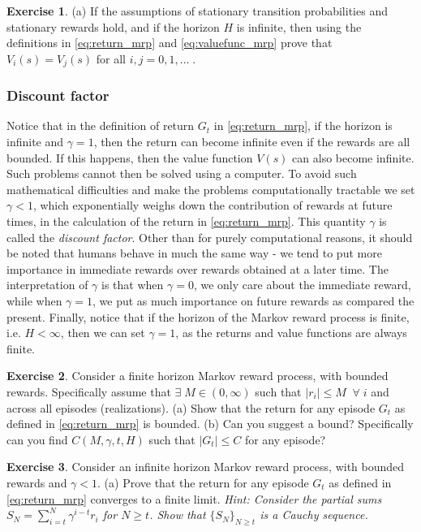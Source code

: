 \documentclass{article}
\theoremstyle{definition}
\newtheorem{exercise}{Exercise}[section]
\theoremstyle{remark}
\begin{document}
\begin{exercise}
(a) If the assumptions of stationary transition probabilities and stationary rewards hold, and if the horizon $H$ is infinite, then using the definitions in \eqref{eq:return_mrp} and \eqref{eq:valuefunc_mrp} prove that $V_i(s) = V_j(s)$ for all $i,j = 0,1,\dots \;$.
\label{ex-infinite-horizon-value}
\end{exercise}

\subsubsection{Discount factor}
Notice that in the definition of return $G_t$ in \eqref{eq:return_mrp}, if the horizon is infinite and $\gamma = 1$, then the return can become infinite even if the rewards are all bounded. If this happens, then the value function $V(s)$ can also become infinite. Such problems cannot then be solved using a computer. To avoid such mathematical difficulties and make the problems computationally tractable we set $\gamma < 1$, which exponentially weighs down the contribution of rewards at future times, in the calculation of the return in \eqref{eq:return_mrp}. This quantity $\gamma$ is called the \textit{discount factor}. Other than for purely computational reasons, it should be noted that humans behave in much the same way - we tend to put more importance in immediate rewards over rewards obtained at a later time. The interpretation of $\gamma$ is that when $\gamma = 0$, we only care about the immediate reward, while when $\gamma = 1$, we put as much importance on future rewards as compared the present. Finally, notice that if the horizon of the Markov reward process is finite, i.e. $H < \infty$, then we can set $\gamma = 1$, as the returns and value functions are always finite.

\begin{exercise}
Consider a finite horizon Markov reward process, with bounded rewards. Specifically assume that $\exists \; M \in (0,\infty)$ such that $|r_i| \leq M \;\; \forall \; i$ and across all episodes (realizations). (a) Show that the return for any episode $G_t$ as defined in \eqref{eq:return_mrp} is bounded. (b) Can you suggest a bound? Specifically can you find $C(M,\gamma,t,H)$ such that $|G_t| \leq C$ for any episode?
\label{ex-discount-finite}
\end{exercise}

\begin{exercise}
Consider an infinite horizon Markov reward process, with bounded rewards and $\gamma < 1$. (a) Prove that the return for any episode $G_t$ as defined in \eqref{eq:return_mrp} converges to a finite limit. \textit{Hint: Consider the partial sums $S_N = \sum_{i=t}^{N}\gamma^{i-t} r_i$ for $N \geq t$. Show that $\{S_N\}_{N \geq t}$ is a Cauchy sequence.}
\label{ex-discount-infinite}
\end{exercise}
\end{document}

